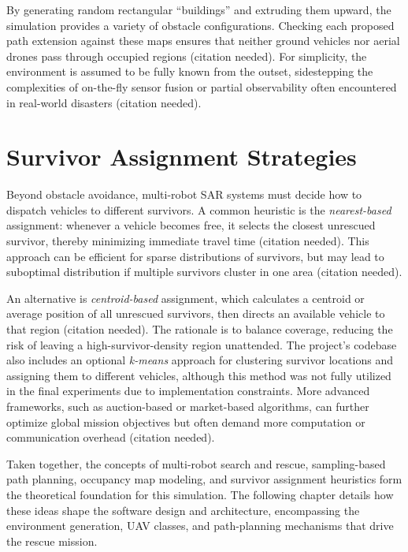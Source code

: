 \documentclass[12pt,a4paper]{report}
\begin{document}
By generating random rectangular “buildings” and extruding them upward, the simulation provides a 
variety of obstacle configurations. Checking each proposed path extension against these maps 
ensures that neither ground vehicles nor aerial drones pass through occupied regions (citation needed). 
For simplicity, the environment is assumed to be fully known from the outset, sidestepping the complexities 
of on-the-fly sensor fusion or partial observability often encountered in real-world disasters 
(citation needed).

\section{Survivor Assignment Strategies}
\label{sec:survivor_assignment}
Beyond obstacle avoidance, multi-robot SAR systems must decide how to dispatch vehicles to 
different survivors. A common heuristic is the \emph{nearest-based} assignment: whenever a vehicle 
becomes free, it selects the closest unrescued survivor, thereby minimizing immediate travel time 
(citation needed). This approach can be efficient for sparse distributions of survivors, but may 
lead to suboptimal distribution if multiple survivors cluster in one area (citation needed).

An alternative is \emph{centroid-based} assignment, which calculates a centroid or average position 
of all unrescued survivors, then directs an available vehicle to that region (citation needed). The 
rationale is to balance coverage, reducing the risk of leaving a high-survivor-density region 
unattended. The project’s codebase also includes an optional \emph{k-means} approach for clustering 
survivor locations and assigning them to different vehicles, although this method was not fully 
utilized in the final experiments due to implementation constraints. More advanced frameworks, 
such as auction-based or market-based algorithms, can further optimize global mission objectives 
but often demand more computation or communication overhead (citation needed).

\bigskip

Taken together, the concepts of multi-robot search and rescue, sampling-based path planning, 
occupancy map modeling, and survivor assignment heuristics form the theoretical foundation 
for this simulation. The following chapter details how these ideas shape the software design 
and architecture, encompassing the environment generation, UAV classes, and path-planning 
mechanisms that drive the rescue mission.
\end{document}
